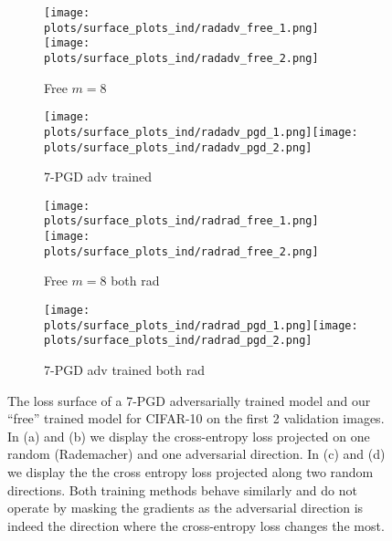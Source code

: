 \documentclass{article}
\begin{document}
\begin{figure}[t]
\centering
\begin{subfigure}{.45\textwidth}
    \centering
    \begin{minipage}[b]{1.0\linewidth}
        \texttt{[image: plots/surface\_plots\_ind/radadv\_free\_1.png]}\texttt{[image: plots/surface\_plots\_ind/radadv\_free\_2.png]}
    \end{minipage}
    \caption{Free $m=8$}
    \label{fig:loss_free8_rad_adv}
\end{subfigure}
\begin{subfigure}{.45\textwidth}
    \begin{minipage}[b]{1.0\linewidth}
        \texttt{[image: plots/surface\_plots\_ind/radadv\_pgd\_1.png]}\texttt{[image: plots/surface\_plots\_ind/radadv\_pgd\_2.png]}
    \end{minipage}
    \caption{7-PGD adv trained}
    \label{fig:loss_PGD7_rad_adv}
\end{subfigure}
\begin{subfigure}{.45\textwidth}
    \centering
    \begin{minipage}[b]{1.0\linewidth}
        \texttt{[image: plots/surface\_plots\_ind/radrad\_free\_1.png]}\texttt{[image: plots/surface\_plots\_ind/radrad\_free\_2.png]}
    \end{minipage}
    \caption{Free $m=8$ both rad}
    \label{fig:loss_free8_rad_rad}
\end{subfigure}
\begin{subfigure}{.45\textwidth}
    \begin{minipage}[b]{1.0\linewidth}
        \texttt{[image: plots/surface\_plots\_ind/radrad\_pgd\_1.png]}\texttt{[image: plots/surface\_plots\_ind/radrad\_pgd\_2.png]}
    \end{minipage}
    \caption{7-PGD adv trained both rad}
    \label{fig:loss_PGD7_rad_rad}
\end{subfigure}\hfill
\caption{
The loss surface of a 7-PGD adversarially trained model and our ``free'' trained model for CIFAR-10 on the first 2 validation images. In (a) and (b) we display the cross-entropy loss projected on one random (Rademacher) and one adversarial direction. In (c) and (d) we display the the cross entropy loss projected along two random directions. Both training methods behave similarly and do not operate by masking the gradients as the adversarial direction is indeed the direction where the cross-entropy loss changes the most.}
\label{fig:loss_plots}
\end{figure}
\end{document}
